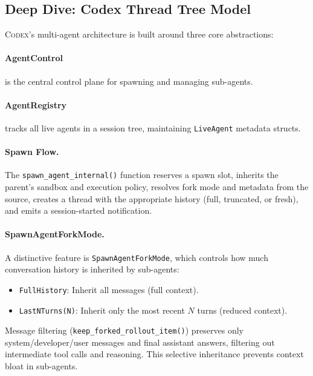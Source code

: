 \documentclass[11pt,a4paper]{article}
\newcommand{\cdx}{\textsc{Codex}\xspace}
\begin{document}
\subsection{Deep Dive: Codex Thread Tree Model}
\label{sec:codex_multiagent}

\cdx{}'s multi-agent architecture is built around three core abstractions:

\paragraph{AgentControl} is the central control plane for spawning and managing sub-agents.

\paragraph{AgentRegistry} tracks all live agents in a session tree, maintaining \texttt{LiveAgent} metadata structs.

\paragraph{Spawn Flow.}
The \texttt{spawn\_agent\_internal()} function reserves a spawn slot, inherits the parent's sandbox and execution policy, resolves fork mode and metadata from the source, creates a thread with the appropriate history (full, truncated, or fresh), and emits a session-started notification.

\paragraph{SpawnAgentForkMode.}
A distinctive feature is \texttt{SpawnAgentForkMode}, which controls how much conversation history is inherited by sub-agents:
\begin{itemize}[itemsep=1pt]
  \item \texttt{FullHistory}: Inherit all messages (full context).
  \item \texttt{LastNTurns(N)}: Inherit only the most recent $N$ turns (reduced context).
\end{itemize}

Message filtering (\texttt{keep\_forked\_rollout\_item()}) preserves only system/developer/user messages and final assistant answers, filtering out intermediate tool calls and reasoning.
This selective inheritance prevents context bloat in sub-agents.
\end{document}
